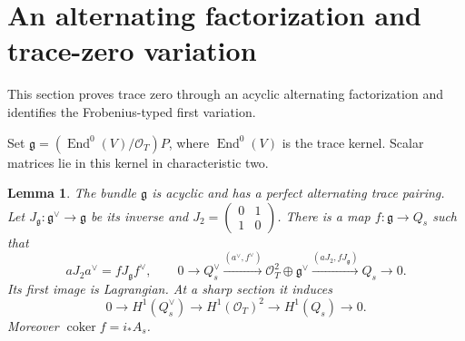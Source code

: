 \documentclass[11pt]{article}
\newtheorem{lemma}[theorem]{Lemma}
\theoremstyle{definition}\newtheorem{definition}[theorem]{Definition}
\theoremstyle{remark}\newtheorem{remark}[theorem]{Remark}
\newcommand{\OO}{\mathcal O}
\begin{document}
\section{An alternating factorization and trace-zero variation}
\label{sec:tracezero}

This section proves trace zero through an acyclic alternating factorization and identifies the Frobenius-typed first variation.

Set $\mathfrak g=(\operatorname{End}^0(V)/\OO_T)P$, where
$\operatorname{End}^0(V)$ is the trace kernel. Scalar matrices lie in this kernel in characteristic two.

\begin{lemma}\label{lem:factor}
The bundle $\mathfrak g$ is acyclic and has a perfect alternating trace pairing. Let $J_{\mathfrak g}:\mathfrak g^\vee\to\mathfrak g$ be its inverse and $J_2=\left(\begin{smallmatrix}0&1\\1&0\end{smallmatrix}\right)$. There is a map $f:\mathfrak g\to Q_s$ such that
\[
 aJ_2a^\vee=fJ_{\mathfrak g}f^\vee,\qquad
 0\to Q_s^\vee\xrightarrow{(a^\vee,f^\vee)}
 \OO_T^2\oplus\mathfrak g^\vee
 \xrightarrow{(aJ_2,fJ_{\mathfrak g})}Q_s\to0.              \tag{F1}
\]
Its first image is Lagrangian. At a sharp section it induces
\[
 0\to H^1(Q_s^\vee)\to H^1(\OO_T)^2\to H^1(Q_s)\to0.       \tag{F2}
\]
Moreover $\operatorname{coker}f=i_*A_s$.
\end{lemma}
\end{document}
